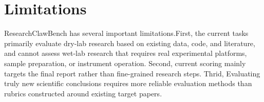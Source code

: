 \section{Limitations}

ResearchClawBench has several important limitations.First, the current tasks primarily evaluate dry-lab research based on existing data, code, and literature, and cannot assess wet-lab research that requires real experimental platforms, sample preparation, or instrument operation. Second, current scoring mainly targets the final report rather than fine-grained research steps. Thrid, Evaluating truly new scientific conclusions requires more reliable evaluation methods than rubrics constructed around existing target papers.

